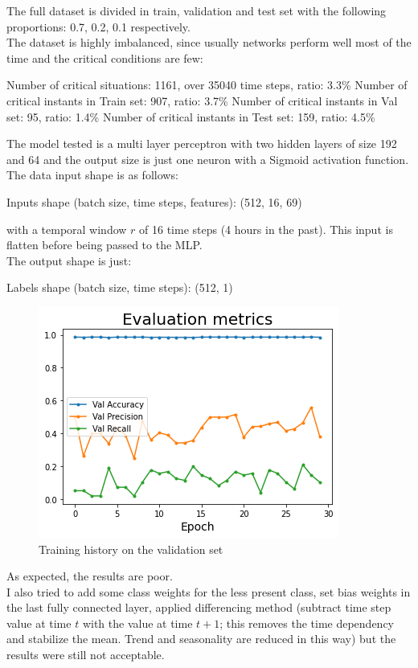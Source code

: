 The full dataset is divided in train, validation and test set with the following proportions: 0.7, 0.2, 0.1 respectively. \\
The dataset is highly imbalanced, since usually networks perform well most of the time and the critical conditions are few:


\begin{algorithm}[h]
    \State Number of critical situations: 1161, over 35040 time steps, ratio: 3.3\%
    \State
    \State Number of critical instants in Train set: 907, ratio: 3.7\%
    \State Number of critical instants in Val set: 95, ratio: 1.4\%
    \State Number of critical instants in Test set: 159, ratio: 4.5\%
\end{algorithm}

The model tested is a multi layer perceptron with two hidden layers of size 192 and 64 and the output size is just one neuron with a Sigmoid activation function.\\
The data input shape is as follows:
\begin{algorithm}[H]
    \State Inputs shape (batch size, time steps, features): (512, 16, 69)
\end{algorithm}
\noindent with a temporal window $r$ of 16 time steps (4 hours in the past). This input is flatten before being passed to the MLP. \\
The output shape is just:
\begin{algorithm}[h]
    \State Labels shape (batch size, time steps): (512, 1)
\end{algorithm}

\begin{figure}[H]
\centering
    \includegraphics[width=.6\linewidth]{images/MVOberr/DenseNNResult.png}
\caption{Training history on the validation set}
 \end{figure}
\noindent As expected, the results are poor. \\
I also tried to add some class weights for the less present class, set bias weights in the last fully connected layer, applied differencing method (subtract time step value at time $t$ with the value at time $t+1$; this removes the time dependency and stabilize the mean. Trend and seasonality are reduced in this way) but the results were still not acceptable.\\

